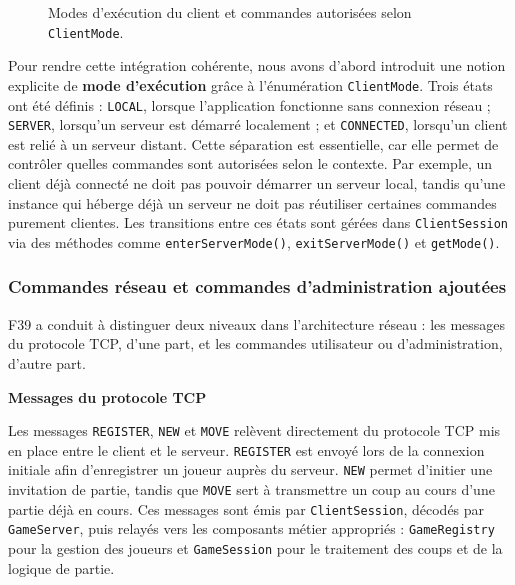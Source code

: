 \documentclass[a4paper]{article}
\begin{document}
\begin{figure}[H]
    \caption{Modes d'exécution du client et commandes autorisées selon \texttt{ClientMode}.}
    \label{fig:clientmode}
\end{figure}


Pour rendre cette intégration cohérente, nous avons d'abord introduit une notion explicite de
\textbf{mode d'exécution} grâce à l'énumération \texttt{ClientMode}.
Trois états ont été définis : \texttt{LOCAL},
lorsque l'application fonctionne sans connexion réseau ; \texttt{SERVER},
lorsqu'un serveur est démarré localement ; et \texttt{CONNECTED},
lorsqu'un client est relié à un serveur distant. Cette séparation est essentielle,
car elle permet de contrôler quelles commandes sont autorisées selon le contexte.
Par exemple, un client déjà connecté ne doit pas pouvoir démarrer un serveur local,
tandis qu'une instance qui héberge déjà un serveur ne doit pas réutiliser certaines
commandes purement clientes.
Les transitions entre ces états sont gérées dans \texttt{ClientSession} via des méthodes comme
\texttt{enterServerMode()}, \texttt{exitServerMode()} et \texttt{getMode()}.


\subsubsection{Commandes réseau et commandes d'administration ajoutées}

F39 a conduit à distinguer deux niveaux dans l'architecture réseau : les
messages du protocole TCP, d'une part, et les commandes utilisateur ou
d'administration, d'autre part.

\medskip
\noindent\textbf{Messages du protocole TCP}

Les messages \texttt{REGISTER}, \texttt{NEW} et \texttt{MOVE} relèvent
directement du protocole TCP mis en place entre le client et le serveur.
\texttt{REGISTER} est envoyé lors de la connexion initiale afin d'enregistrer
un joueur auprès du serveur. \texttt{NEW} permet d'initier une invitation de
partie, tandis que \texttt{MOVE} sert à transmettre un coup au cours d'une
partie déjà en cours. Ces messages sont émis par \texttt{ClientSession},
décodés par \texttt{GameServer}, puis relayés vers les composants métier
appropriés : \texttt{GameRegistry} pour la gestion des joueurs et
\texttt{GameSession} pour le traitement des coups et de la logique de partie.
\end{document}
